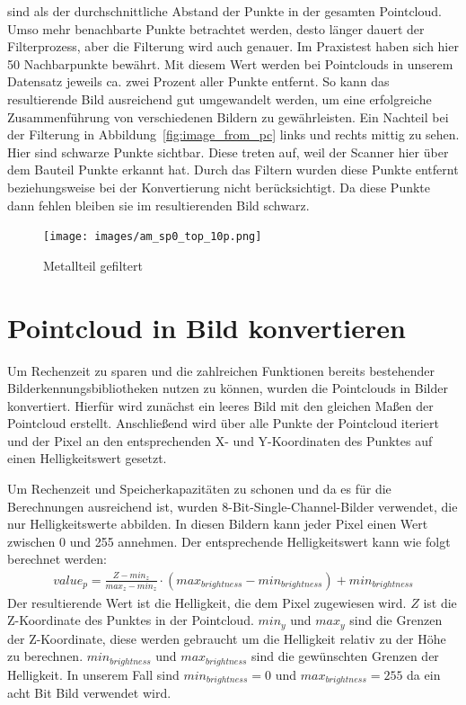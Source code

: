 sind als der durchschnittliche Abstand der Punkte in der gesamten Pointcloud. 
Umso mehr benachbarte Punkte betrachtet werden, desto länger dauert der Filterprozess, 
aber die Filterung wird auch genauer. Im Praxistest haben sich
hier 50 Nachbarpunkte bewährt. Mit diesem Wert werden bei Pointclouds in unserem 
Datensatz jeweils ca. zwei Prozent aller Punkte entfernt. So kann das resultierende
Bild ausreichend gut umgewandelt werden, um eine erfolgreiche Zusammenführung 
von verschiedenen Bildern zu gewährleisten.
Ein Nachteil bei der Filterung in Abbildung~\ref{fig:image_from_pc} links und rechts 
mittig zu sehen. Hier sind schwarze Punkte sichtbar. Diese treten auf, weil der Scanner
hier über dem Bauteil Punkte erkannt hat. Durch das Filtern wurden diese Punkte entfernt
beziehungsweise bei der Konvertierung nicht berücksichtigt. Da diese Punkte dann fehlen
bleiben sie im resultierenden Bild schwarz.

\begin{figure}[H]
    \centering
    \texttt{[image: images/am\_sp0\_top\_10p.png]}
    \caption{Metallteil gefiltert}
    \label{fig:metall_image}
\end{figure}

\section{Pointcloud in Bild konvertieren}

Um Rechenzeit zu sparen und die zahlreichen Funktionen bereits bestehender
Bilderkennungsbibliotheken nutzen zu können, wurden die Pointclouds in Bilder 
konvertiert. Hierfür wird zunächst ein leeres Bild mit den gleichen 
Maßen der Pointcloud erstellt. Anschließend wird über alle Punkte der
Pointcloud iteriert und der Pixel an den 
entsprechenden X- und Y-Koordinaten des Punktes auf einen Helligkeitswert gesetzt.

Um Rechenzeit und Speicherkapazitäten zu schonen und 
da es für die Berechnungen ausreichend ist, wurden 
8-Bit-Single-Channel-Bilder verwendet, die nur Helligkeitswerte abbilden. 
In diesen Bildern kann jeder Pixel einen Wert zwischen 0 und 255 annehmen. 
Der entsprechende Helligkeitswert kann wie folgt berechnet werden:
\begin{align}\label{calc:brightness}
    value_p = \frac{Z - min_z}{max_z - min_z} \cdot (max_{brightness} - min_{brightness}) + min_{brightness}
\end{align}
Der resultierende Wert ist die Helligkeit, die dem Pixel zugewiesen wird.
$Z$ ist die Z-Koordinate des Punktes in der Pointcloud. $min_y$ und $max_y$ sind 
die Grenzen der Z-Koordinate, diese werden gebraucht um die Helligkeit relativ 
zu der Höhe zu berechnen. $min_{brightness}$ und $max_{brightness}$ sind die gewünschten Grenzen der 
Helligkeit. In unserem Fall sind $min_{brightness} = 0$ und $max_{brightness} = 255$ da ein acht Bit Bild
verwendet wird.

